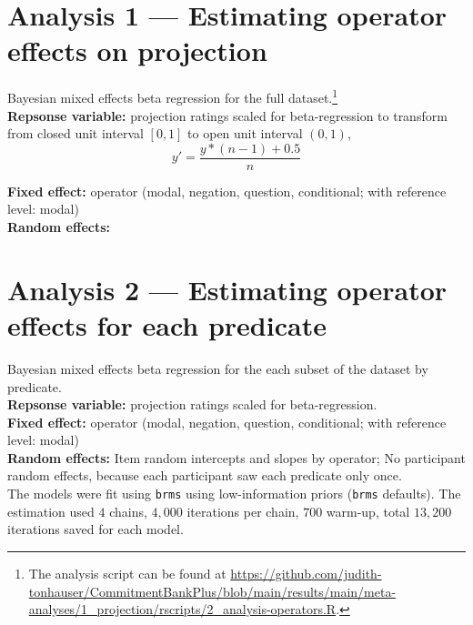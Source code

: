 \documentclass[a4paper,12pt,twoside]{article}
\begin{document}
\section{Analysis 1 --- Estimating operator effects on projection} \label{app:analysis-1}
    
    Bayesian mixed effects beta regression for the full dataset.\footnote{The analysis script can be found at \url{https://github.com/judith-tonhauser/CommitmentBankPlus/blob/main/results/main/meta-analyses/1_projection/rscripts/2_analysis-operators.R}.}\\

    \noindent\textbf{Repsonse variable:} projection ratings scaled for beta-regression to transform from closed unit interval $[0,1]$ to open unit interval $(0,1)$,
    $$y' = \frac{y * (n - 1) + 0.5}{n}$$

    \noindent\textbf{Fixed effect:} operator (modal, negation, question, conditional; with reference level: modal)\\

    \noindent\textbf{Random effects:} 


\section{Analysis 2 --- Estimating operator effects for each predicate} \label{app:analysis-2}

    Bayesian mixed effects beta regression for the each subset of the dataset by predicate.\\

    \noindent\textbf{Repsonse variable:} projection ratings scaled for beta-regression.\\

    \noindent\textbf{Fixed effect:} operator (modal, negation, question, conditional; with reference level: modal)\\

    \noindent\textbf{Random effects:} Item random intercepts and slopes by operator; No participant random effects, because each participant saw each predicate only once.\\

    \noindent The models were fit using \texttt{brms}
    using low-information priors (\texttt{brms} defaults). The estimation used $4$ chains, $4,000$ iterations per chain, $700$ warm-up, total $13,200$ iterations saved for each model.
\end{document}
